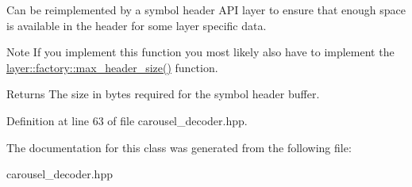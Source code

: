 Can be reimplemented by a symbol header A\-P\-I layer to ensure that enough space is available in the header for some layer specific data. 

\begin{DoxyNote}{Note}
If you implement this function you most likely also have to implement the \hyperlink{group__codec__header__api_ga7138ea5d64116c9594774e0a3806eece}{layer\-::factory\-::max\-\_\-header\-\_\-size()} function.
\end{DoxyNote}
\begin{DoxyReturn}{Returns}
The size in bytes required for the symbol header buffer. 
\end{DoxyReturn}


Definition at line 63 of file carousel\-\_\-decoder.\-hpp.



The documentation for this class was generated from the following file\-:\begin{DoxyCompactItemize}
\item 
carousel\-\_\-decoder.\-hpp\end{DoxyCompactItemize}
